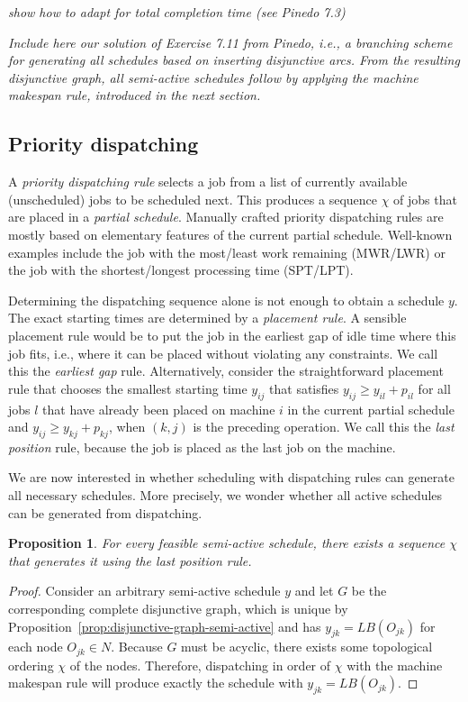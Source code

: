 \documentclass{article}
\theoremstyle{definition}
\theoremstyle{plain}
\newtheorem{proposition}{Proposition}[section]
\begin{document}
\noindent
\textit{\color{blue}show how to adapt for total completion time (see Pinedo 7.3)}
\vspace{0.5em}

\noindent
\textit{\color{blue}Include here our solution of Exercise 7.11 from Pinedo,
i.e., a branching scheme for generating all schedules based on inserting
disjunctive arcs. From the resulting disjunctive graph, all semi-active
schedules follow by applying the machine makespan rule, introduced in the next
section.}


\subsection{Priority dispatching}

A \textit{priority dispatching rule} selects a job from a list of currently
available (unscheduled) jobs to be scheduled next. This produces a sequence
$\chi$ of jobs that are placed in a \textit{partial schedule}. Manually crafted
priority dispatching rules are mostly based on elementary features of the
current partial schedule. Well-known examples include the job with the
most/least work remaining (MWR/LWR) or the job with the shortest/longest
processing time (SPT/LPT).

Determining the dispatching sequence alone is not enough to obtain a schedule
$y$. The exact starting times are determined by a \textit{placement rule}. A
sensible placement rule would be to put the job in the earliest gap of idle time
where this job fits, i.e., where it can be placed without violating any
constraints. We call this the \textit{earliest gap} rule. Alternatively,
consider the straightforward placement rule that chooses the smallest starting
time $y_{ij}$ that satisfies $y_{ij} \geq y_{il} + p_{il}$ for all jobs $l$ that
have already been placed on machine $i$ in the current partial schedule and
$y_{ij} \geq y_{kj} + p_{kj}$, when $(k,j)$ is the preceding operation. We call
this the \textit{last position} rule, because the job is placed as the last job
on the machine.

We are now interested in whether scheduling with dispatching rules can generate
all necessary schedules. More precisely, we wonder whether all active schedules
can be generated from dispatching.

\begin{proposition}
  For every feasible semi-active schedule, there exists a sequence $\chi$ that
  generates it using the last position rule.
\end{proposition}
\begin{proof}
  Consider an arbitrary semi-active schedule $y$ and let $G$ be the
  corresponding complete disjunctive graph, which is unique by
  Proposition~\ref{prop:disjunctive-graph-semi-active} and has
  $y_{jk} = LB(O_{jk})$ for each node $O_{jk} \in N$. Because $G$ must be
  acyclic, there exists some topological ordering $\chi$ of the nodes.
  Therefore, dispatching in order of $\chi$ with the machine makespan rule will
  produce exactly the schedule with $y_{jk} = LB(O_{jk})$.
\end{proof}
\end{document}
